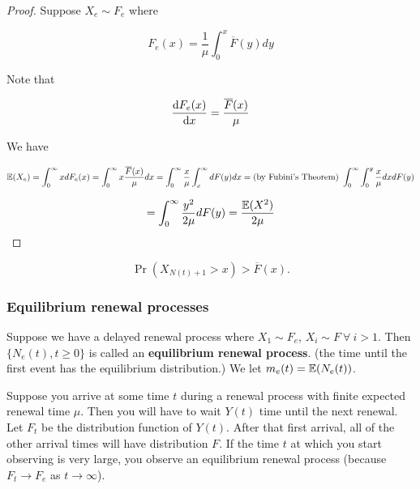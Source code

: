 \begin{proof}

Suppose \(X_e \sim F_e\) where

\[
F_e(x) = \frac{1}{\mu} \int_0^x \overline{F}(y) dy 
\]

Note that

\[
\deriv{F_e(x)}{x} = \frac{\overline{F}(x)}{\mu}
\]

We have

\[
\E(X_e) = \int_0^\infty x  dF_e(x) = \int_0^\infty x \frac{\overline{F}(x)}{\mu} dx = \int_0^\infty \frac{x}{\mu} \int_x^\infty dF(y) dx = \text{(by Fubini's Theorem) }  \int_0^\infty  \int_0^y \frac{x}{\mu}  dx dF(y)
\]

\[
=  \int_0^\infty  \frac{y^2}{2 \mu} dF(y) = \frac{\E(X^2)}{2 \mu}
\]


\end{proof}


\begin{proposition}

\[
\Pr(X_{N(t)+1} > x) > \overline{F}(x).
\]

\end{proposition}

\subsubsection{Equilibrium renewal processes}


\begin{definition}
Suppose we have a delayed renewal process where \(X_1\sim F_e\), \(X_i \sim F \ \forall \ i > 1\). Then \(\{N_e(t), t \geq 0 \}\) is called an \textbf{equilibrium renewal process}. (the time until the first event has the equilibrium distribution.) We let \(m_e(t) = \E(N_e(t))\).

\end{definition}

\begin{example}
Suppose you arrive at some time \(t\) during a renewal process with finite expected renewal time \(\mu\). Then you will have to wait \(Y(t)\) time until the next renewal. Let \(F_t\) be the distribution function of \(Y(t)\). After that first arrival, all of the other arrival times will have distribution \(F\). If the time \(t\) at which you start observing is very large, you observe an equilibrium renewal process (because \(F_t \to F_e\) as \(t \to \infty\)).

\end{example}

